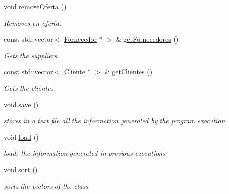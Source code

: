 \begin{DoxyCompactItemize}
\mbox{\label{classEmpresa_a5b5c42d733ccee37f932db5db8aec243}} 
void \hyperlink{classEmpresa_a5b5c42d733ccee37f932db5db8aec243}{remove\+Oferta} ()
\begin{DoxyCompactList}\small\item\em Removes an oferta. \end{DoxyCompactList}\item 
const std\+::vector$<$ \hyperlink{classFornecedor}{Fornecedor} $\ast$ $>$ \& \hyperlink{classEmpresa_aaf131a375aa70819205744328a4dbc07}{get\+Fornecedores} ()
\begin{DoxyCompactList}\small\item\em Gets the suppliers. \end{DoxyCompactList}\item 
const std\+::vector$<$ \hyperlink{classCliente}{Cliente} $\ast$ $>$ \& \hyperlink{classEmpresa_a472beae89ee1187e1ec3f70e9d4a99ef}{get\+Clientes} ()
\begin{DoxyCompactList}\small\item\em Gets the clientes. \end{DoxyCompactList}\item 
\mbox{\label{classEmpresa_afbde694da902870437443de43dae8071}} 
void \hyperlink{classEmpresa_afbde694da902870437443de43dae8071}{save} ()
\begin{DoxyCompactList}\small\item\em stores in a text file all the information generated by the program execution \end{DoxyCompactList}\item 
\mbox{\label{classEmpresa_a3445c3c507b4f45d1d7831908ff4cdf1}} 
void \hyperlink{classEmpresa_a3445c3c507b4f45d1d7831908ff4cdf1}{load} ()
\begin{DoxyCompactList}\small\item\em loads the information generated in previous executions \end{DoxyCompactList}\item 
\mbox{\label{classEmpresa_aa7424cde3bdf1b1921967bc176d0ab50}} 
void \hyperlink{classEmpresa_aa7424cde3bdf1b1921967bc176d0ab50}{sort} ()
\begin{DoxyCompactList}\small\item\em sorts the vectors of the class \end{DoxyCompactList}\end{DoxyCompactItemize}


